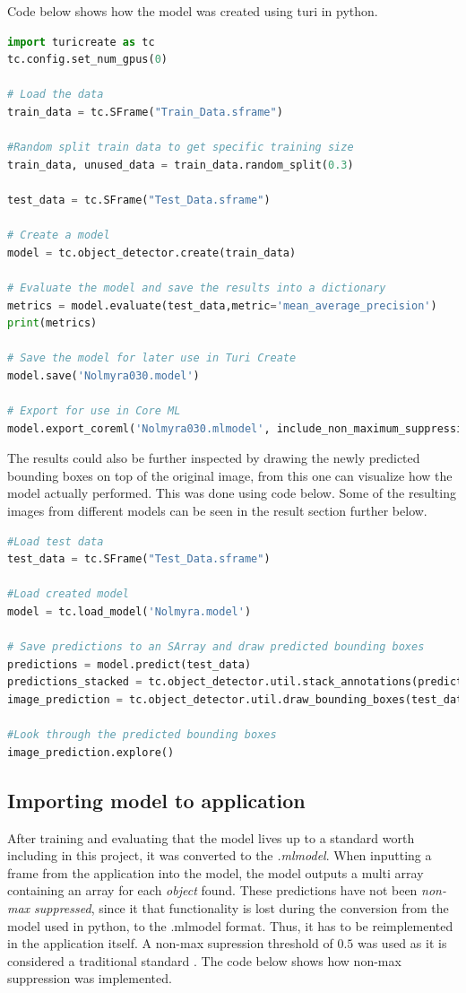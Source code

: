Code below shows how the model was created using turi in python.
\begin{lstlisting}[language=python]
import turicreate as tc
tc.config.set_num_gpus(0)

# Load the data
train_data = tc.SFrame("Train_Data.sframe")

#Random split train data to get specific training size
train_data, unused_data = train_data.random_split(0.3)

test_data = tc.SFrame("Test_Data.sframe")

# Create a model
model = tc.object_detector.create(train_data)

# Evaluate the model and save the results into a dictionary
metrics = model.evaluate(test_data,metric='mean_average_precision')
print(metrics)

# Save the model for later use in Turi Create
model.save('Nolmyra030.model')

# Export for use in Core ML
model.export_coreml('Nolmyra030.mlmodel', include_non_maximum_suppression=False)
\end{lstlisting}
The results could also be further inspected by drawing the newly predicted bounding boxes on top of the original image, from this one can visualize how the model actually performed. This was done using code below. Some of the resulting images from different models can be seen in the result section further below. 

\begin{lstlisting}[language=python]
#Load test data
test_data = tc.SFrame("Test_Data.sframe")

#Load created model
model = tc.load_model('Nolmyra.model')

# Save predictions to an SArray and draw predicted bounding boxes
predictions = model.predict(test_data)
predictions_stacked = tc.object_detector.util.stack_annotations(predictions)
image_prediction = tc.object_detector.util.draw_bounding_boxes(test_data['image'], predictions)

#Look through the predicted bounding boxes
image_prediction.explore()
\end{lstlisting}

\subsection{Importing model to application}
After training and evaluating that the model lives up to a standard worth including in this
 project, it was converted to the \textit{.mlmodel}. When inputting a frame from the
application into the model, the model outputs a multi array containing an array for each
  \textit{object} found. These predictions have not been \textit{non-max suppressed}, since it that functionality is lost during the conversion from the model used in python, to the .mlmodel format. Thus, it has to be reimplemented in the application itself. 
  A non-max supression threshold of $0.5$ was used as it is considered a traditional standard \cite{nms}. The code below shows how non-max suppression was implemented. 

